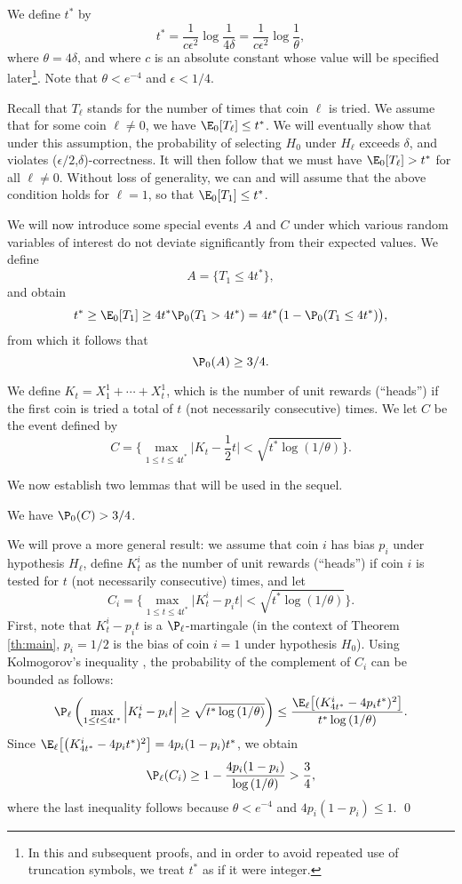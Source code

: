 We define $t^*$ by
\begin{equation}
\label{eq:tstardef}
t^* = \frac{1}{c\epsilon^2}\log\frac{1}{4\delta}
= \frac{1}{c\epsilon^2}\log\frac{1}{\theta}  ,
\end{equation}
where $\theta= 4\delta$, and
where $c$ is an absolute constant whose value will be specified
later\footnote{In this and subsequent proofs, and in order to avoid
repeated use of truncation symbols, we treat $t^*$ as if it were
integer.}. Note that $\theta<e^{-4}$ and $\epsilon<1/4$.

Recall that $T_\ell$ stands for the number of times that coin
$\ell$ is tried. We assume  that for some coin $\ell\neq 0$, we have
$\E_0[T_\ell] \leq t^*$. We will eventually show that under this assumption,
the probability of selecting $H_0$
under $H_\ell$ exceeds $\delta$, and violates
($\epsilon/2$,$\delta$)-correctness. It will then follow
that we must have $\E_0[T_\ell] > t^*$ for all $\ell\neq 0$.
Without loss of generality, we can and will
assume that the above condition holds for $\ell=1$, so that $\E_0[T_1] \leq t^*$.

We will now introduce some special events $A$ and $C$ under which various random variables
of interest do not deviate significantly from their expected values.
We define
$$A = \{ T_1 \le 4 t^*\},$$
and obtain
$$t^*\geq \E_0[T_1]
\geq 4t^* \P_0(T_1> 4t^*)= 4t^*\big(1-\P _0(T_1\leq 4t^*)\big),$$
from which it follows that
$$\P_0 (A) \geq 3/4.$$


We define $K_t=X^1_1+\cdots+X^1_t$, which is the number of unit
rewards (``heads'') if the first coin is tried  a total of $t$ (not necessarily consecutive) times.
We let
$C$ be the event defined by
$$C = \Big\{  \displaystyle{ \max_{1\le t \le
4t^*} \Big|K_t - \frac{1}{2} t\Big| < \sqrt{t^*
\log{(1/\theta)}}\Big\}.}$$

We now establish two lemmas that will be used in the sequel.
\begin{lemma}\label{le:kolmogorov}
We have $\P_0(C) > 3/4$.
\end{lemma}
\proof
We will prove a more general result: we assume that coin $i$ has bias $p_i$ under hypothesis $H_\ell$,  define $K^i_t$ as the number of unit
rewards (``heads'') if coin $i$ is tested for $t$ (not necessarily consecutive) times,
and let
$$C_i = \Big\{  \displaystyle{ \max_{1\le t \le
4t^*} \Big|K^i_t - p_i t\Big| < \sqrt{t^*
\log{(1/\theta)}}\Big\}.}$$
First, note that $K^i_t - p_i t$ is a $\P_{\ell}$-martingale (in the context of Theorem \ref{th:main}, $p_i=1/2$ is the bias
of coin $i=1$ under hypothesis $H_0$).
Using Kolmogorov's inequality \cite[Corollary 7.66, in p.\ 244 of][]{Ross},
the probability of the complement of
$C_i$ can be bounded as follows:
$$
\P_{\ell} \left(\max_{1\le t \le 4t^*} \Big| K^i_t -p_i t\Big|
\ge \sqrt{t^*
\log{(1/\theta)}}\right )
\le  \frac {\E_{\ell} \big[(K^i_{4t^*} -4p_i  t^*)^2\big]}{t^*
\log{(1/\theta)}}.
$$
Since $\E_{\ell} \big[\big(K^i_{4t^*} - 4 p_i t^*)^2\big]
=   4p_i(1-p_i)t^*$, we
obtain
\begin{equation} \label{eq:C_ibound}
\P_{\ell}(C_i) \geq  1- \frac{4 p_i(1-p_i)}{ \log{(1/\theta)}}>
\frac{3}{4},
\end{equation}
where
the last inequality follows because $\theta< e^{-4}$ and
$4p_i (1-p_i)\le1$.
\qed

